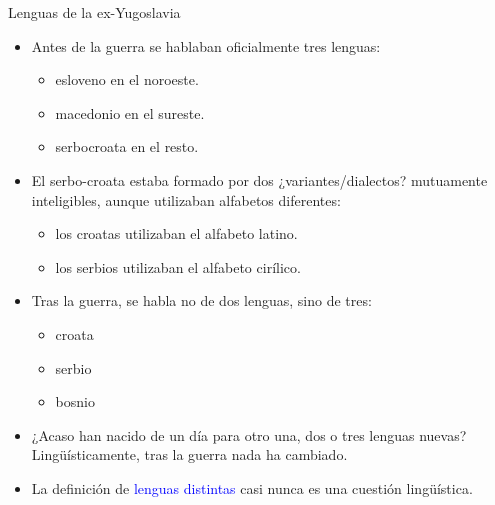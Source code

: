 \documentclass[handout]{beamer}
\begin{document}
\begin{frame}{Lenguas de la ex-Yugoslavia}

\begin{itemize}
	\item Antes de la guerra se hablaban oficialmente tres lenguas:
	\begin{itemize}
		\item esloveno en el noroeste.
		\item macedonio en el sureste.
		\item serbocroata en el resto.
	\end{itemize}

	\item El serbo-croata estaba formado por dos ¿variantes/dialectos? mutuamente inteligibles, aunque utilizaban alfabetos diferentes:

	\begin{itemize}
		\item los croatas utilizaban el alfabeto latino.
		\item los serbios utilizaban el alfabeto cirílico.
	\end{itemize}

	\item Tras la guerra, se habla no de dos lenguas, sino de tres: 
	\begin{itemize}
		\item croata
		\item serbio
		\item bosnio
	\end{itemize}
	\item ¿Acaso han nacido de un día para otro una, dos o tres lenguas nuevas? Lingüísticamente, tras la guerra nada ha cambiado. 
	\item La definición de \textcolor{blue}{lenguas distintas} casi nunca es una cuestión lingüística. 
	\end{itemize}
\end{frame}
\end{document}
